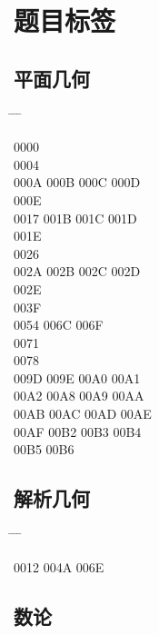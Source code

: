\documentclass[twoside, twocolumn]{ctexart}
\newenvironment{problist}{
  \begin{center} \ttfamily \begin{tabbing}
      \hspace{50pt} \= \hspace{50pt} \= \hspace{50pt} \= \kill
  }{ \end{tabbing} \end{center} }
\begin{document}
  \balance

  \section*{题目标签}

  \subsection*{平面几何}

  \begin{problist}
    0000    \\ 0004    \\
    000A \> 000B \> 000C \> 000D \\ 000E    \\
    0017 \> 001B \> 001C \> 001D \\ 001E    \\
    0026    \\ 002A \> 002B \> 002C \> 002D \\
    002E    \\ 003F    \\
    0054  \> 006C \> 006F \\ 0071    \\
    0078    \\ 009D \> 009E \> 00A0 \> 00A1 \\
    00A2 \> 00A8 \> 00A9 \> 00AA \\ 00AB \> 00AC \> 00AD \> 00AE \\
    00AF \> 00B2 \> 00B3 \> 00B4 \\ 00B5 \> 00B6 \\
  \end{problist}

  \subsection*{解析几何}

  \begin{problist}
    0012  \> 004A \> 006E \\
  \end{problist}

  \subsection*{数论}
\end{document}
